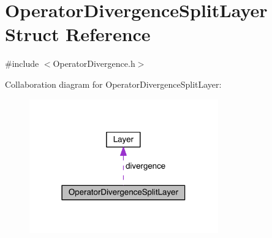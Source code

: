 \hypertarget{struct_operator_divergence_split_layer}{}\section{Operator\+Divergence\+Split\+Layer Struct Reference}
\label{struct_operator_divergence_split_layer}


{\ttfamily \#include $<$Operator\+Divergence.\+h$>$}



Collaboration diagram for Operator\+Divergence\+Split\+Layer\+:\nopagebreak
\begin{figure}[H]
\begin{center}
\leavevmode
\includegraphics[width=231pt]{d8/d42/struct_operator_divergence_split_layer__coll__graph}
\end{center}
\end{figure}
